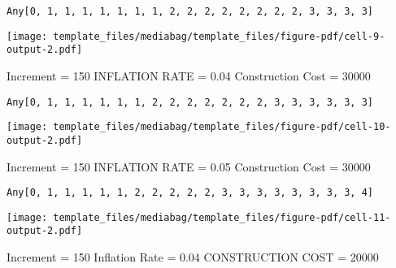 \documentclass[
  letterpaper,
  DIV=11,
  numbers=noendperiod]{scrartcl}
\begin{document}
\begin{verbatim}
Any[0, 1, 1, 1, 1, 1, 1, 1, 2, 2, 2, 2, 2, 2, 2, 2, 3, 3, 3, 3]
\end{verbatim}

\texttt{[image: template\_files/mediabag/template\_files/figure-pdf/cell-9-output-2.pdf]}

Increment = 150 INFLATION RATE = 0.04 Construction Cost = 30000

\begin{verbatim}
Any[0, 1, 1, 1, 1, 1, 1, 2, 2, 2, 2, 2, 2, 2, 3, 3, 3, 3, 3, 3]
\end{verbatim}

\texttt{[image: template\_files/mediabag/template\_files/figure-pdf/cell-10-output-2.pdf]}

Increment = 150 INFLATION RATE = 0.05 Construction Cost = 30000

\begin{verbatim}
Any[0, 1, 1, 1, 1, 1, 2, 2, 2, 2, 2, 3, 3, 3, 3, 3, 3, 3, 3, 4]
\end{verbatim}

\texttt{[image: template\_files/mediabag/template\_files/figure-pdf/cell-11-output-2.pdf]}

Increment = 150 Inflation Rate = 0.04 CONSTRUCTION COST = 20000
\end{document}
